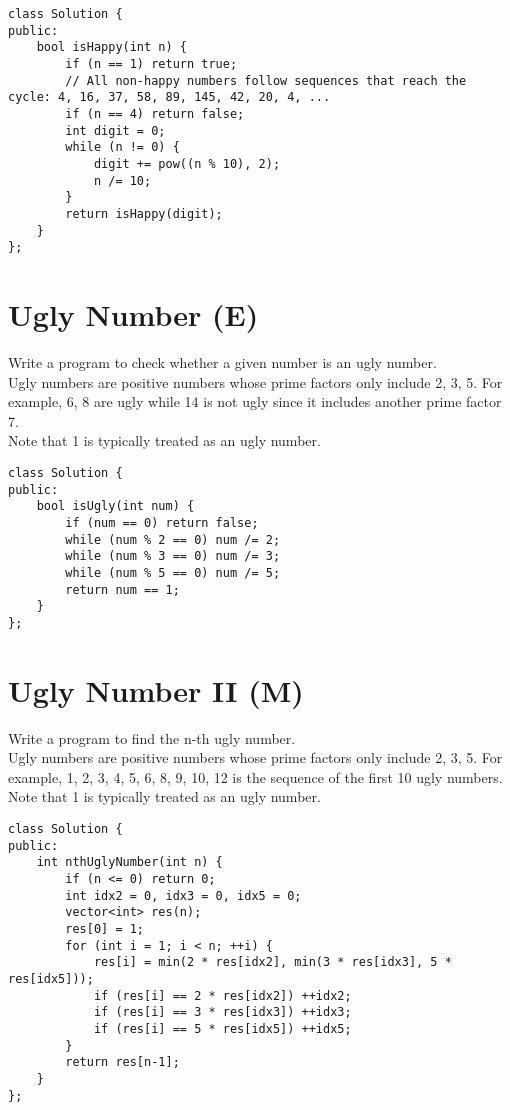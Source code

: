 \begin{lstlisting}
class Solution {
public:
    bool isHappy(int n) {
        if (n == 1) return true;
        // All non-happy numbers follow sequences that reach the cycle: 4, 16, 37, 58, 89, 145, 42, 20, 4, ... 
        if (n == 4) return false;
        int digit = 0;
        while (n != 0) {
            digit += pow((n % 10), 2);
            n /= 10;
        }
        return isHappy(digit);
    }
};
\end{lstlisting}


\section{Ugly Number (E)}
Write a program to check whether a given number is an ugly number.\\

Ugly numbers are positive numbers whose prime factors only include 2, 3, 5. For example, 6, 8 are ugly while 14 is not ugly since it includes another prime factor 7.\\

Note that 1 is typically treated as an ugly number. \\

\begin{lstlisting}
class Solution {
public:
    bool isUgly(int num) {
        if (num == 0) return false;
        while (num % 2 == 0) num /= 2;
        while (num % 3 == 0) num /= 3;
        while (num % 5 == 0) num /= 5;
        return num == 1;
    }
};
\end{lstlisting}


\section{Ugly Number II (M)}
Write a program to find the n-th ugly number. \\

Ugly numbers are positive numbers whose prime factors only include 2, 3, 5. For example, 1, 2, 3, 4, 5, 6, 8, 9, 10, 12 is the sequence of the first 10 ugly numbers. \\

Note that 1 is typically treated as an ugly number. \\

\begin{lstlisting}
class Solution {
public:
    int nthUglyNumber(int n) {
        if (n <= 0) return 0;
        int idx2 = 0, idx3 = 0, idx5 = 0;
        vector<int> res(n);
        res[0] = 1;
        for (int i = 1; i < n; ++i) {
            res[i] = min(2 * res[idx2], min(3 * res[idx3], 5 * res[idx5]));
            if (res[i] == 2 * res[idx2]) ++idx2;
            if (res[i] == 3 * res[idx3]) ++idx3;
            if (res[i] == 5 * res[idx5]) ++idx5;
        }
        return res[n-1];
    }
};
\end{lstlisting}


